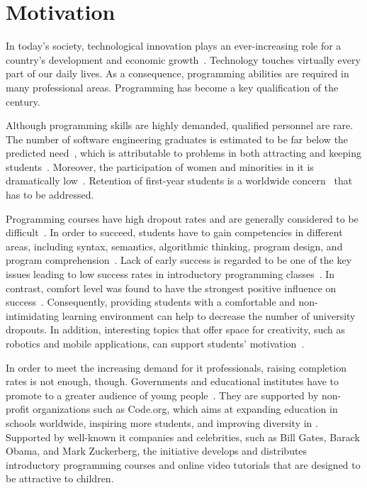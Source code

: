 \section{Motivation}\label{section:motivation}

In today's society, technological innovation plays an ever-increasing role for a country's development and economic growth~\cite{alhumoud2014using}. Technology touches virtually every part of our daily lives. As a consequence, programming abilities are required in many professional areas. Programming has become a key qualification of the  century.

Although programming skills are highly demanded, qualified personnel are rare. The number of software engineering graduates is estimated to be far below the predicted need~\cite{vogel2014quality}, which is attributable to problems in both attracting and keeping students~\cite{blank2006robots}. Moreover, the participation of women and minorities in \gls{it} is dramatically low~\cite{blank2006robots,vogel2014quality}. Retention of first-year \cs students is a worldwide concern~\cite{lykke2014motivating} that has to be addressed.

Programming courses have high dropout rates and are generally considered to be difficult~\cite{lykke2014motivating,robins2003learning}. In order to succeed, students have to gain competencies in different areas, including syntax, semantics, algorithmic thinking, program design, and program comprehension~\cite{mueller2010learning}. Lack of early success is regarded to be one of the key issues leading to low success rates in introductory programming classes~\cite{truong2005learning}. In contrast, comfort level was found to have the strongest positive influence on success~\cite{wilson2001contributing}. Consequently, providing students with a comfortable and non-intimidating learning environment can help to decrease the number of university dropouts. In addition, interesting topics that offer space for creativity, such as robotics and mobile applications, can support students' motivation~\cite{petre2004using}.

In order to meet the increasing demand for \gls{it} professionals, raising completion rates is not enough, though. Governments and educational institutes have to promote \cs to a greater audience of young people~\cite{giordano2014use}. They are supported by non-profit organizations such as Code.org, which aims at expanding \cs education in schools worldwide, inspiring more students, and improving diversity in \cs. Supported by well-known \gls{it} companies and celebrities, such as Bill Gates, Barack Obama, and Mark Zuckerberg, the initiative develops and distributes introductory programming courses and online video tutorials that are designed to be attractive to children.


